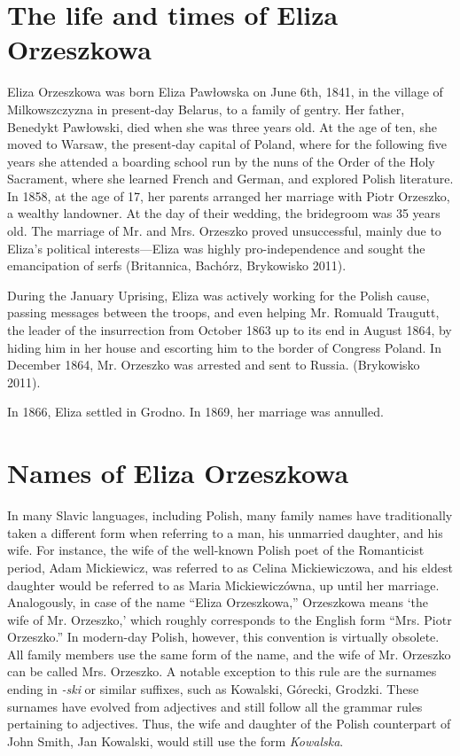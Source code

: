 \section{The life and times of Eliza Orzeszkowa}

Eliza Orzeszkowa was born Eliza Pawłowska on June 6th, 1841, in the village of Milkowszczyzna in present-day Belarus, to a family of gentry. Her father, Benedykt Pawłowski, died when she was three years old. 
At the age of ten, she moved to Warsaw, the present-day capital of Poland, where for the following five years she attended a boarding school run by the nuns of the Order of the Holy Sacrament, where she learned French and German, and explored Polish literature.
In 1858, at the age of 17, her parents arranged her marriage with Piotr Orzeszko, a wealthy landowner.
At the day of their wedding, the bridegroom was 35 years old.
The marriage of Mr. and Mrs. Orzeszko proved unsuccessful, mainly due to Eliza's political interests---Eliza was highly pro-independence and sought the emancipation of serfs (Britannica, Bachórz, Brykowisko 2011).

During the January Uprising, Eliza was actively working for the Polish cause, passing messages between the troops, and even helping Mr. Romuald Traugutt, the leader of the insurrection from October 1863 up to its end in August 1864, by hiding him in her house and escorting him to the border of Congress Poland.
In December 1864, Mr. Orzeszko was arrested and sent to Russia.
(Brykowisko 2011).

In 1866, Eliza settled in Grodno. In 1869, her marriage was annulled.

\section{Names of Eliza Orzeszkowa}

In many Slavic languages, including Polish, many family names have traditionally taken a different form when referring to a man, his unmarried daughter, and his wife.
For instance, the wife of the well-known Polish poet of the Romanticist period, Adam Mickiewicz, was referred to as Celina Mickiewiczowa, and his eldest daughter would be referred to as Maria Mickiewiczówna, up until her marriage.
Analogously, in case of the name ``Eliza Orzeszkowa,'' Orzeszkowa means `the wife of Mr. Orzeszko,' which roughly corresponds to the English form ``Mrs. Piotr Orzeszko.''
In modern-day Polish, however, this convention is virtually obsolete.
All family members use the same form of the name, and the wife of Mr. Orzeszko can be called Mrs. Orzeszko.
A notable exception to this rule are the surnames ending in \textit{-ski} or similar suffixes, such as Kowalski, Górecki, Grodzki.
These surnames have evolved from adjectives and still follow all the grammar rules pertaining to adjectives.
Thus, the wife and daughter of the Polish counterpart of John Smith, Jan Kowalski, would still use the form \textit{Kowalska}. 

